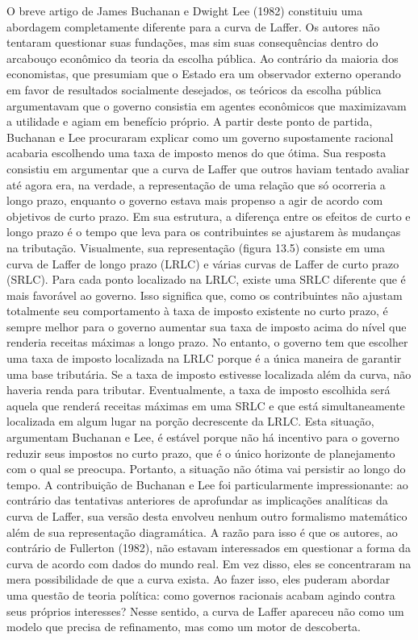 \documentclass[12pt]{article}
\begin{document}
O breve artigo de James Buchanan e Dwight Lee (1982) constituiu uma abordagem completamente diferente para a curva de Laffer. Os autores não tentaram questionar suas fundações, mas sim suas consequências dentro do arcabouço econômico da teoria da escolha pública. Ao contrário da maioria dos economistas, que presumiam que o Estado era um observador externo operando em favor de resultados socialmente desejados, os teóricos da escolha pública argumentavam que o governo consistia em agentes econômicos que maximizavam a utilidade e agiam em benefício próprio. A partir deste ponto de partida, Buchanan e Lee procuraram explicar como um governo supostamente racional acabaria escolhendo uma taxa de imposto menos do que ótima. Sua resposta consistiu em argumentar que a curva de Laffer que outros haviam tentado avaliar até agora era, na verdade, a representação de uma relação que só ocorreria a longo prazo, enquanto o governo estava mais propenso a agir de acordo com objetivos de curto prazo. Em sua estrutura, a diferença entre os efeitos de curto e longo prazo é o tempo que leva para os contribuintes se ajustarem às mudanças na tributação. Visualmente, sua representação (figura 13.5) consiste em uma curva de Laffer de longo prazo (LRLC) e várias curvas de Laffer de curto prazo (SRLC). Para cada ponto localizado na LRLC, existe uma SRLC diferente que é mais favorável ao governo. Isso significa que, como os contribuintes não ajustam totalmente seu comportamento à taxa de imposto existente no curto prazo, é sempre melhor para o governo aumentar sua taxa de imposto acima do nível que renderia receitas máximas a longo prazo. No entanto, o governo tem que escolher uma taxa de imposto localizada na LRLC porque é a única maneira de garantir uma base tributária. Se a taxa de imposto estivesse localizada além da curva, não haveria renda para tributar. Eventualmente, a taxa de imposto escolhida será aquela que renderá receitas máximas em uma SRLC e que está simultaneamente localizada em algum lugar na porção decrescente da LRLC. Esta situação, argumentam Buchanan e Lee, é estável porque não há incentivo para o governo reduzir seus impostos no curto prazo, que é o único horizonte de planejamento com o qual se preocupa. Portanto, a situação não ótima vai persistir ao longo do tempo. A contribuição de Buchanan e Lee foi particularmente impressionante: ao contrário das tentativas anteriores de aprofundar as implicações analíticas da curva de Laffer, sua versão desta envolveu nenhum outro formalismo matemático além de sua representação diagramática. A razão para isso é que os autores, ao contrário de Fullerton (1982), não estavam interessados em questionar a forma da curva de acordo com dados do mundo real. Em vez disso, eles se concentraram na mera possibilidade de que a curva exista. Ao fazer isso, eles puderam abordar uma questão de teoria política: como governos racionais acabam agindo contra seus próprios interesses? Nesse sentido, a curva de Laffer apareceu não como um modelo que precisa de refinamento, mas como um motor de descoberta.
\end{document}
